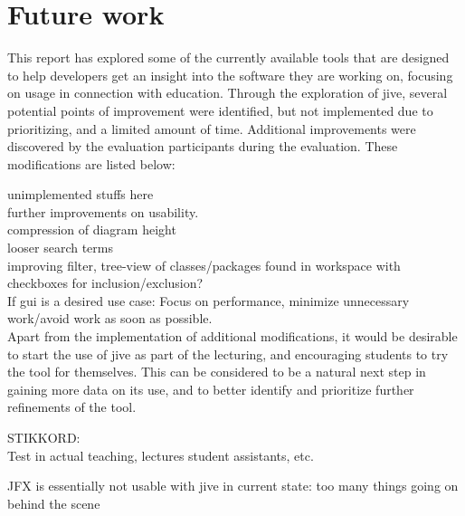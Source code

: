 \section{Future work}\label{conclusionFuture}
This report has explored some of the currently available tools that are designed to help developers get an insight into the software they are working on, focusing on usage in connection with education.
Through the exploration of \gls{jive}, several potential points of improvement were identified, but not implemented due to prioritizing, and a limited amount of time.
Additional improvements were discovered by the evaluation participants during the evaluation.
These modifications are listed below: %


unimplemented stuffs here\\
further improvements on usability.\\
compression of diagram height\\
looser search terms\\
improving filter, tree-view of classes/packages found in workspace with checkboxes for inclusion/exclusion?\\
If gui is a desired use case: Focus on performance, minimize unnecessary work/avoid work as soon as possible.\\


Apart from the implementation of additional modifications, it would be desirable to start the use of \gls{jive} as part of the lecturing, and encouraging students to try the tool for themselves.
This can be considered to be a natural next step in gaining more data on its use, and to better identify and prioritize further refinements of the tool.


STIKKORD:\\
Test in actual teaching, lectures student assistants, etc.

JFX is essentially not usable with \gls{jive} in current state: too many things going on behind the scene\\


